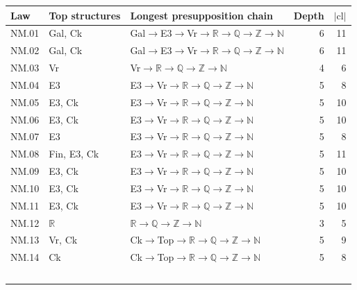{\scriptsize\setlength{\tabcolsep}{3pt}
\begin{longtable}{l p{4.6cm} p{7.4cm} r r}
\toprule
Law & Top structures & Longest presupposition chain & Depth & $|\mathrm{cl}|$ \\
\midrule
\endhead
\bottomrule\endfoot
NM.01 & \textsf{Gal}, \textsf{Ck} & \textsf{Gal}$\to$\textsf{E3}$\to$\textsf{Vr}$\to$$\mathbb R$$\to$$\mathbb Q$$\to$$\mathbb Z$$\to$$\mathbb N$ & 6 & 11 \\
NM.02 & \textsf{Gal}, \textsf{Ck} & \textsf{Gal}$\to$\textsf{E3}$\to$\textsf{Vr}$\to$$\mathbb R$$\to$$\mathbb Q$$\to$$\mathbb Z$$\to$$\mathbb N$ & 6 & 11 \\
NM.03 & \textsf{Vr} & \textsf{Vr}$\to$$\mathbb R$$\to$$\mathbb Q$$\to$$\mathbb Z$$\to$$\mathbb N$ & 4 & 6 \\
NM.04 & \textsf{E3} & \textsf{E3}$\to$\textsf{Vr}$\to$$\mathbb R$$\to$$\mathbb Q$$\to$$\mathbb Z$$\to$$\mathbb N$ & 5 & 8 \\
NM.05 & \textsf{E3}, \textsf{Ck} & \textsf{E3}$\to$\textsf{Vr}$\to$$\mathbb R$$\to$$\mathbb Q$$\to$$\mathbb Z$$\to$$\mathbb N$ & 5 & 10 \\
NM.06 & \textsf{E3}, \textsf{Ck} & \textsf{E3}$\to$\textsf{Vr}$\to$$\mathbb R$$\to$$\mathbb Q$$\to$$\mathbb Z$$\to$$\mathbb N$ & 5 & 10 \\
NM.07 & \textsf{E3} & \textsf{E3}$\to$\textsf{Vr}$\to$$\mathbb R$$\to$$\mathbb Q$$\to$$\mathbb Z$$\to$$\mathbb N$ & 5 & 8 \\
NM.08 & \textsf{Fin}, \textsf{E3}, \textsf{Ck} & \textsf{E3}$\to$\textsf{Vr}$\to$$\mathbb R$$\to$$\mathbb Q$$\to$$\mathbb Z$$\to$$\mathbb N$ & 5 & 11 \\
NM.09 & \textsf{E3}, \textsf{Ck} & \textsf{E3}$\to$\textsf{Vr}$\to$$\mathbb R$$\to$$\mathbb Q$$\to$$\mathbb Z$$\to$$\mathbb N$ & 5 & 10 \\
NM.10 & \textsf{E3}, \textsf{Ck} & \textsf{E3}$\to$\textsf{Vr}$\to$$\mathbb R$$\to$$\mathbb Q$$\to$$\mathbb Z$$\to$$\mathbb N$ & 5 & 10 \\
NM.11 & \textsf{E3}, \textsf{Ck} & \textsf{E3}$\to$\textsf{Vr}$\to$$\mathbb R$$\to$$\mathbb Q$$\to$$\mathbb Z$$\to$$\mathbb N$ & 5 & 10 \\
NM.12 & $\mathbb R$ & $\mathbb R$$\to$$\mathbb Q$$\to$$\mathbb Z$$\to$$\mathbb N$ & 3 & 5 \\
NM.13 & \textsf{Vr}, \textsf{Ck} & \textsf{Ck}$\to$\textsf{Top}$\to$$\mathbb R$$\to$$\mathbb Q$$\to$$\mathbb Z$$\to$$\mathbb N$ & 5 & 9 \\
NM.14 & \textsf{Ck} & \textsf{Ck}$\to$\textsf{Top}$\to$$\mathbb R$$\to$$\mathbb Q$$\to$$\mathbb Z$$\to$$\mathbb N$ & 5 & 8 \\
$$
\end{longtable}}
